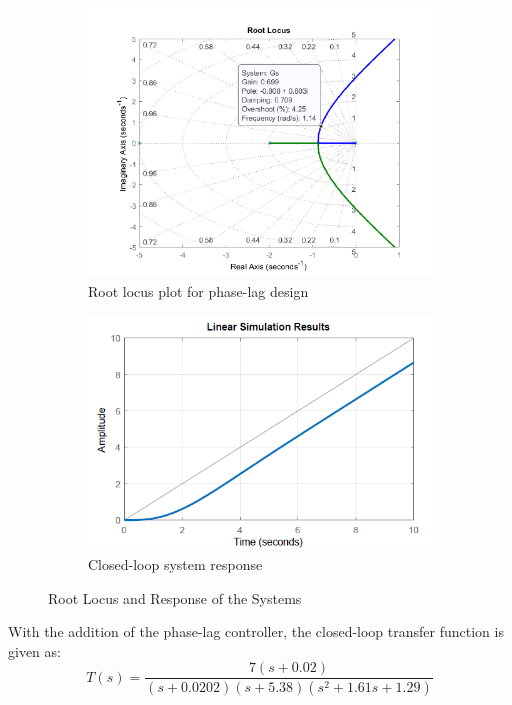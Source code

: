 \documentclass[12pt]{article}
\begin{document}
\begin{figure}[H]
    \centering
    \begin{subfigure}[b]{0.45\textwidth}
    \centering
    \includegraphics[width=\textwidth]{figs/7.5-1.png}
     \caption{Root locus plot for phase-lag design}
     \end{subfigure}
     \begin{subfigure}[b]{0.45\textwidth}
     \centering
        \includegraphics[width=\textwidth]{figs/7.5-2.png}
     \caption{ Closed-loop system response}
     \end{subfigure}
    \caption{Root Locus and Response of the Systems}\label{fig:prb20}
\end{figure}

\noindent With the addition of the phase-lag controller, the closed-loop transfer function is given as:
$$
T(s)=\frac{7(s+0.02)}{(s+0.0202)(s+5.38)\left(s^2+1.61 s+1.29\right)}
$$
\end{document}
